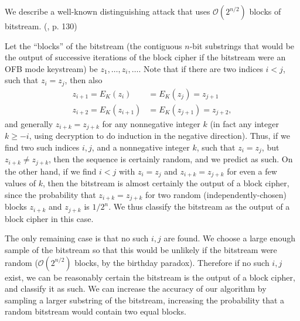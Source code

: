 We describe a well-known distinguishing attack that uses 
$\mathcal{O}(2^{n/2})$ blocks of bitstream. (\cite{dist}, p. 130)

Let the ``blocks'' of the bitstream (the contiguous $n$-bit substrings
that would be the output of successive iterations of the block cipher if
the bitstream were an OFB mode keystream)
be $z_1,\dots,z_i,\dots$. Note that
if there are two indices $i<j$, such that $z_i=z_j$, then
also 
\begin{align*}
	z_{i+1}=E_K(z_i)&=E_K(z_j)=z_{j+1} \\
	z_{i+2}=E_K(z_{i+1})&=E_K(z_{j+1})=z_{j+2},
\end{align*} and generally
$z_{i+k}=z_{j+k}$ for any nonnegative integer $k$ (in fact any integer
$k\ge-i$, using decryption to do induction in the negative direction).
Thus, if we find two such indices $i,j$, and a nonnegative integer $k$,
such that $z_i=z_j$, but $z_{i+k} \neq z_{j+k}$, then the sequence
is certainly random, and we predict as such. On the other hand, if we
find $i<j$ with $z_i=z_j$ and $z_{i+k}=z_{j+k}$ for even a few values of
$k$, then the bitstream is almost certainly the output of a block cipher,
since the probability that $z_{i+k}=z_{j+k}$ for two random 
(independently-chosen) blocks
$z_{i+k}$ and $z_{j+k}$ is $1/2^n$. We thus classify the bitstream as
the output of a block cipher in this case.

The only remaining case is that no such $i,j$ are found. We choose
a large enough sample of the bitstream so that this would be unlikely
if the bitstream were random ($\mathcal{O}(2^{n/2})$ blocks, by the
	birthday paradox). Therefore if no such $i,j$ exist, we can be
	reasonably certain the bitstream is the output of a block cipher, and
	classify it as such.
	We can increase the accuracy of our algorithm by sampling a larger
	substring of the bitstream, increasing the probability that a random
	bitstream would contain two equal blocks.
